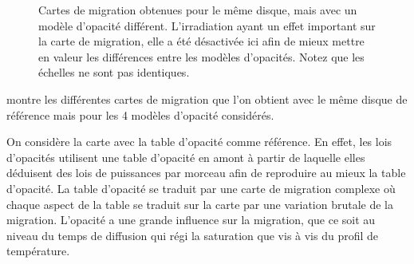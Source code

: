 \begin{figure}[htb]
\centering
{}\hfill
{}

\hfill
{}
\caption{Cartes de migration obtenues pour le même disque, mais avec un modèle d'opacité différent. L'irradiation ayant un
effet important sur la carte de migration, elle a été désactivée ici afin de mieux mettre en valeur les différences entre
les modèles d'opacités. Notez que les échelles ne sont pas identiques.}
\end{figure}\label{fig:opacity_tables}

 montre les différentes cartes de migration que l'on obtient avec le même disque de référence mais
pour les 4 modèles d'opacité considérés. 

On considère la carte avec la table d'opacité  comme référence. En effet, les lois d'opacités utilisent
une table d'opacité en amont à partir de laquelle elles déduisent des lois de puissances par morceau afin de reproduire au mieux
la table d'opacité. La table d'opacité se traduit par une carte de migration complexe où chaque aspect de la table se traduit
sur la carte par une variation brutale de la migration. L'opacité a une grande influence sur la migration, que ce soit au
niveau du temps de diffusion qui régi la saturation que vis à vis du profil de température.

